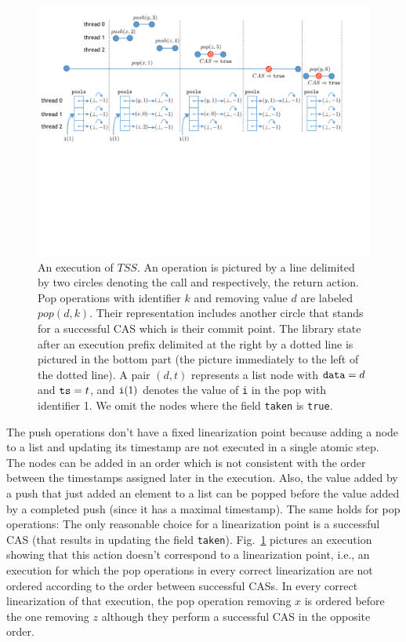 \begin{figure}[t]
\centering
\includegraphics[width=11.5cm]{fig-tss.pdf}
\vspace{-3mm}
\caption{An execution of $\mathit{TSS}$. An operation is pictured by a line delimited by two circles denoting the call and respectively, the return action. Pop operations with identifier $k$ and removing value $d$ are labeled $pop(d,k)$. Their representation includes another circle that stands for a successful CAS which is their commit point. The library state after an execution prefix delimited at the right by a dotted line is pictured in the bottom part (the picture immediately to the left of the dotted line). A pair $(d,t)$ represents a list node with ${\tt data}=d$ and ${\tt ts}=t$, and ${\tt i}(1)$ denotes the value of {\tt i} in the pop with identifier 1. We omit the nodes where the field {\tt taken} is {\tt true}.}
\label{fig:commit}
\vspace{-4mm}
\end{figure}


The push operations don't have a fixed linearization point because adding a node to a list and updating its timestamp are not executed in a single atomic step. The nodes can be added in an order which is not consistent with the order between the timestamps assigned later in the execution. Also, the value added by a push that just added an element to a list can be popped before the value added by a completed push (since it has a maximal timestamp). The same holds for pop operations: The only reasonable choice for a linearization point is a successful CAS (that results in updating the field {\tt taken}). Fig.~\ref{fig:commit} pictures an execution showing that this action doesn't correspond to a linearization point, i.e., an execution for which the pop operations in every correct linearization are not ordered according to the order between successful CASs. In every correct linearization of that execution, the pop operation removing $x$ is ordered before the one removing $z$ although they perform a successful CAS in the opposite order.

